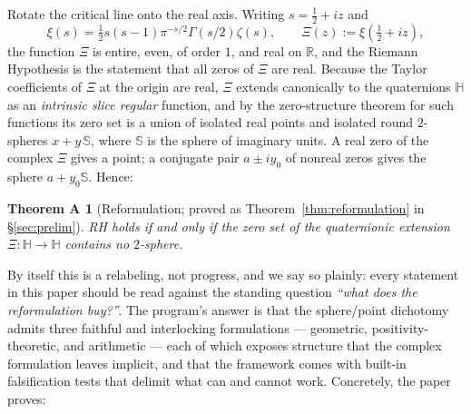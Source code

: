 \documentclass[11pt]{amsart}
\theoremstyle{plain}
\newtheorem*{theoremA}{Theorem A}
\theoremstyle{definition}
\theoremstyle{remark}
\newcommand{\HH}{\mathbb{H}}
\newcommand{\RR}{\mathbb{R}}
\renewcommand{\SS}{\mathbb{S}}
\begin{document}
Rotate the critical line onto the real axis. Writing $s=\tfrac12+iz$ and
\[
\xi(s)=\tfrac12 s(s-1)\pi^{-s/2}\Gamma(s/2)\zeta(s),\qquad
\Xi(z):=\xi\!\left(\tfrac12+iz\right),
\]
the function $\Xi$ is entire, even, of order $1$, and real on $\RR$, and the Riemann Hypothesis is
the statement that all zeros of $\Xi$ are real. Because the Taylor coefficients of $\Xi$ at the
origin are real, $\Xi$ extends canonically to the quaternions $\HH$ as an \emph{intrinsic slice
regular} function, and by the zero-structure theorem for such functions its zero set is a union of
isolated real points and isolated round $2$-spheres $x+y\,\SS$, where $\SS$ is the sphere of
imaginary units. A real zero of the complex $\Xi$ gives a point; a conjugate pair $a\pm iy_0$ of
nonreal zeros gives the sphere $a+y_0\SS$. Hence:

\begin{theoremA}[Reformulation; proved as Theorem~\ref{thm:reformulation} in \S\ref{sec:prelim}]
RH holds if and only if the zero set of the quaternionic extension
$\Xi\colon\HH\to\HH$ contains no $2$-sphere.
\end{theoremA}

By itself this is a relabeling, not progress, and we say so plainly: every statement in this paper
should be read against the standing question \emph{``what does the reformulation buy?''}. The
program's answer is that the sphere/point dichotomy admits three faithful and interlocking
formulations --- geometric, positivity-theoretic, and arithmetic --- each of which exposes structure
that the complex formulation leaves implicit, and that the framework comes with built-in
falsification tests that delimit what can and cannot work. Concretely, the paper proves:
\end{document}
